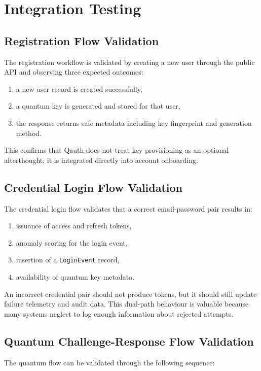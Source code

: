 \section{Integration Testing}

\subsection{Registration Flow Validation}
The registration workflow is validated by creating a new user through the public API and observing three expected outcomes:

\begin{enumerate}
    \item a new user record is created successfully,
    \item a quantum key is generated and stored for that user,
    \item the response returns safe metadata including key fingerprint and generation method.
\end{enumerate}

This confirms that Qauth does not treat key provisioning as an optional afterthought; it is integrated directly into account onboarding.

\subsection{Credential Login Flow Validation}
The credential login flow validates that a correct email-password pair results in:

\begin{enumerate}
    \item issuance of access and refresh tokens,
    \item anomaly scoring for the login event,
    \item insertion of a \texttt{LoginEvent} record,
    \item availability of quantum key metadata.
\end{enumerate}

An incorrect credential pair should not produce tokens, but it should still update failure telemetry and audit data. This dual-path behaviour is valuable because many systems neglect to log enough information about rejected attempts.

\subsection{Quantum Challenge-Response Flow Validation}
The quantum flow can be validated through the following sequence:

